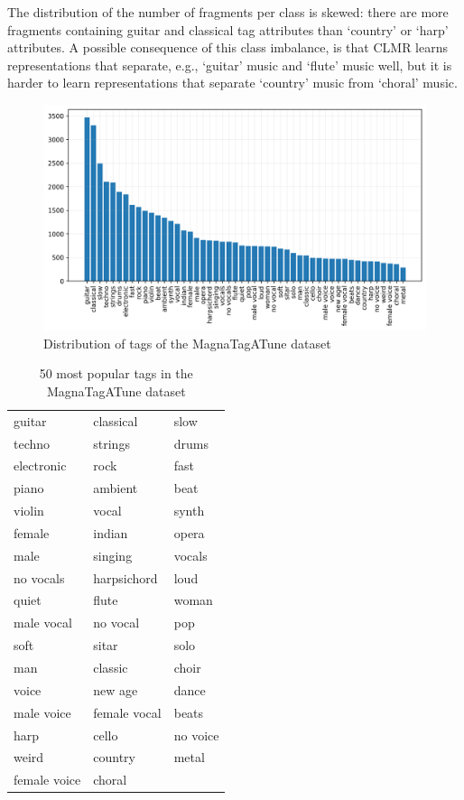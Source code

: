 The distribution of the number of fragments per class is skewed: there are more fragments containing guitar and classical tag attributes than `country' or `harp' attributes. A possible consequence of this class imbalance, is that CLMR learns representations that separate, e.g., `guitar' music and `flute' music well, but it is harder to learn representations that separate `country' music from `choral' music.


\begin{figure}
    \centering
    \includegraphics[width=\columnwidth]{figs/tag_stats_magnatagatune.png}
    \caption{Distribution of tags of the MagnaTagATune dataset}
    \label{fig:tag_stats_magnatagatune}
\end{figure}


\begin{table}[t]
    \centering
    \begin{tabular}{lll}\toprule
        guitar  & classical & slow \\
        techno & strings & drums \\
        electronic & rock & fast \\
        piano & ambient & beat \\
        violin & vocal & synth \\
        female & indian & opera \\
        male & singing & vocals \\
        no vocals & harpsichord & loud \\
        quiet & flute & woman \\
        male vocal & no vocal & pop \\
        soft & sitar & solo \\
        man & classic & choir \\
        voice & new age & dance \\
        male voice & female vocal & beats \\
        harp & cello & no voice \\
        weird & country & metal \\
        female voice & choral & \\                 
        \bottomrule
    \end{tabular}
    \caption{50 most popular tags in the MagnaTagATune dataset}
    \label{tab:magnatagatune_tags}
\end{table}



